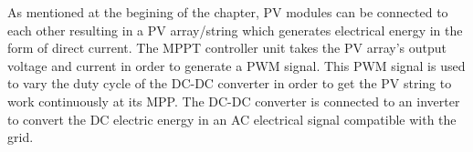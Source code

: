 As mentioned at the begining of the chapter, PV modules can be connected to each other resulting in a PV array/string which generates electrical energy in the form of direct current. The MPPT controller unit takes the PV array's output voltage and current in order to generate a PWM signal. This PWM signal is used to vary the duty cycle of the DC-DC converter in order to get the PV string to work continuously at its MPP. The DC-DC converter is connected to an inverter to convert the DC electric energy in an AC electrical signal compatible with the grid. 

